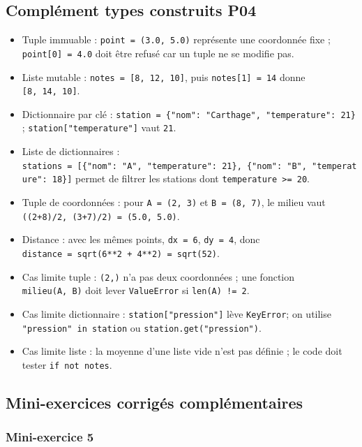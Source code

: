 \subsection{Complément types construits P04}

\begin{itemize}
\tightlist
\item
  Tuple immuable : \texttt{point\ =\ (3.0,\ 5.0)} représente une
  coordonnée fixe ; \texttt{point{[}0{]}\ =\ 4.0} doit être refusé car
  un tuple ne se modifie pas.
\item
  Liste mutable : \texttt{notes\ =\ {[}8,\ 12,\ 10{]}}, puis
  \texttt{notes{[}1{]}\ =\ 14} donne \texttt{{[}8,\ 14,\ 10{]}}.
\item
  Dictionnaire par clé :
  \texttt{station\ =\ \{"nom":\ "Carthage",\ "temperature":\ 21\}} ;
  \texttt{station{[}"temperature"{]}} vaut \texttt{21}.
\item
  Liste de dictionnaires :
  \texttt{stations\ =\ {[}\{"nom":\ "A",\ "temperature":\ 21\},\ \{"nom":\ "B",\ "temperature":\ 18\}{]}}
  permet de filtrer les stations dont
  \texttt{temperature\ \textgreater{}=\ 20}.
\item
  Tuple de coordonnées : pour \texttt{A\ =\ (2,\ 3)} et
  \texttt{B\ =\ (8,\ 7)}, le milieu vaut
  \texttt{((2+8)/2,\ (3+7)/2)\ =\ (5.0,\ 5.0)}.
\item
  Distance : avec les mêmes points, \texttt{dx\ =\ 6},
  \texttt{dy\ =\ 4}, donc
  \texttt{distance\ =\ sqrt(6**2\ +\ 4**2)\ =\ sqrt(52)}.
\item
  Cas limite tuple : \texttt{(2,)} n'a pas deux coordonnées ; une
  fonction \texttt{milieu(A,\ B)} doit lever \texttt{ValueError} si
  \texttt{len(A)\ !=\ 2}.
\item
  Cas limite dictionnaire : \texttt{station{[}"pression"{]}} lève
  \texttt{KeyError}; on utilise \texttt{"pression"\ in\ station} ou
  \texttt{station.get("pression")}.
\item
  Cas limite liste : la moyenne d'une liste vide n'est pas définie ; le
  code doit tester \texttt{if\ not\ notes}.
\end{itemize}

\subsection{Mini-exercices corrigés complémentaires}

\subsubsection{Mini-exercice 5}

